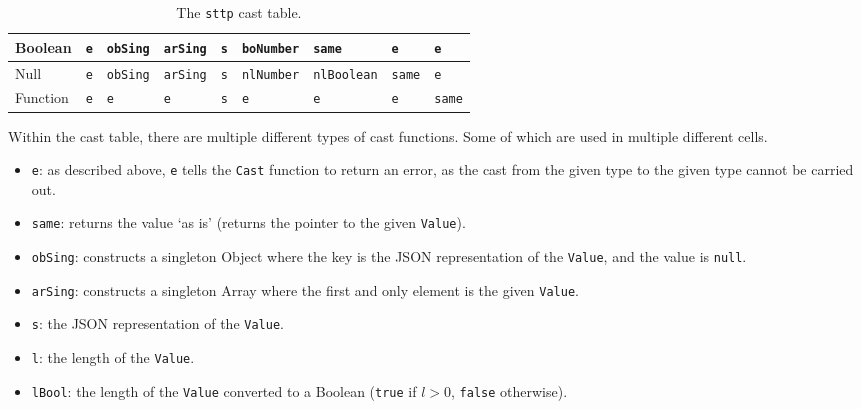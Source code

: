 \begin{table}[H]
\begin{tabular}{|l|l|l|l|l|l|l|l|l|}
    Boolean                  &                            \verb|e| &                       \verb|obSing| &                       \verb|arSing| &                            \verb|s| &                     \verb|boNumber| & \cellcolor[HTML]{C0C0C0}\verb|same| &                            \verb|e| &                            \verb|e| \\ \hline
    Null                     &                            \verb|e| &                       \verb|obSing| &                       \verb|arSing| &                            \verb|s| &                     \verb|nlNumber| &                    \verb|nlBoolean| & \cellcolor[HTML]{C0C0C0}\verb|same| &                            \verb|e| \\ \hline
    Function                 &                            \verb|e| &                            \verb|e| &                            \verb|e| &                            \verb|s| &                            \verb|e| &                            \verb|e| &                            \verb|e| & \cellcolor[HTML]{C0C0C0}\verb|same| \\ \hline
    \end{tabular}
    \cprotect\caption{The \verb|sttp| cast table.}
\end{table}

Within the cast table, there are multiple different types of cast functions. Some of which are used in multiple different cells.

\begin{itemize}
    \item \verb|e|: as described above, \verb|e| tells the \verb|Cast| function to return an error, as the cast from the given type to the given type cannot be carried out.
    \item \verb|same|: returns the value `as is' (returns the pointer to the given \verb|Value|).
    \item \verb|obSing|: constructs a singleton Object where the key is the JSON representation of the \verb|Value|, and the value is \verb|null|.
    \item \verb|arSing|: constructs a singleton Array where the first and only element is the given \verb|Value|.
    \item \verb|s|: the JSON representation of the \verb|Value|.
    \item \verb|l|: the length of the \verb|Value|.
    \item \verb|lBool|: the length of the \verb|Value| converted to a Boolean (\verb|true| if $l > 0$, \verb|false| otherwise).
\end{itemize}

